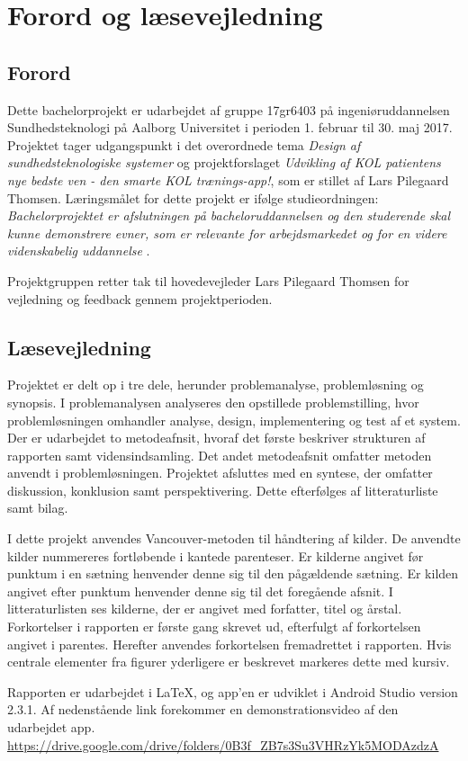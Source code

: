 \chapter*{Forord og læsevejledning}

\section*{Forord}
Dette bachelorprojekt er udarbejdet af gruppe 17gr6403 på ingeniøruddannelsen Sundhedsteknologi på Aalborg Universitet i perioden 1. februar til 30. maj 2017. Projektet tager udgangspunkt i det overordnede tema \textit{Design af sundhedsteknologiske systemer} og projektforslaget \textit{Udvikling af KOL patientens nye bedste ven - den smarte KOL trænings-app!}, som er stillet af Lars Pilegaard Thomsen. 
Læringsmålet for dette projekt er ifølge studieordningen: \textit{Bachelorprojektet er afslutningen på bacheloruddannelsen og den studerende skal kunne demonstrere evner, som er relevante for arbejdsmarkedet og for en videre videnskabelig uddannelse} \cite{Studieordning2014}.

Projektgruppen retter tak til hovedevejleder Lars Pilegaard Thomsen for vejledning og feedback gennem projektperioden.

\section*{Læsevejledning}
Projektet er delt op i tre dele, herunder problemanalyse, problemløsning og synopsis. I problemanalysen analyseres den opstillede problemstilling, hvor problemløsningen omhandler analyse, design, implementering og test af et system. Der er udarbejdet to metodeafnsit, hvoraf det første beskriver strukturen af rapporten samt vidensindsamling. Det andet metodeafsnit omfatter metoden anvendt i problemløsningen. Projektet afsluttes med en syntese, der omfatter diskussion, konklusion samt perspektivering. Dette efterfølges af litteraturliste samt bilag. 

I dette projekt anvendes Vancouver-metoden til håndtering af kilder. De anvendte kilder nummereres fortløbende i kantede parenteser. Er kilderne angivet før punktum i en sætning henvender denne sig til den pågældende sætning. Er kilden angivet efter punktum henvender denne sig til det foregående afsnit. I litteraturlisten ses kilderne, der er angivet med forfatter, titel og årstal. Forkortelser i rapporten er første gang skrevet ud, efterfulgt af forkortelsen angivet i parentes. Herefter anvendes forkortelsen fremadrettet i rapporten. Hvis centrale elementer fra figurer yderligere er beskrevet markeres dette med kursiv. 

Rapporten er udarbejdet i \LaTeX, og app'en er udviklet i Android Studio version 2.3.1.
Af nedenstående link forekommer en demonstrationsvideo af den udarbejdet app. \newline
\url{https://drive.google.com/drive/folders/0B3f_ZB7s3Su3VHRzYk5MODAzdzA}